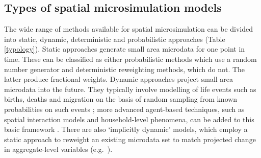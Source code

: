 \subsection{Types of spatial microsimulation models} %
\label{types-msim}
The wide range of methods available for spatial microsimulation can be divided
into static, dynamic, deterministic and probabilistic approaches (Table
\ref{typology}). Static approaches generate small
area microdata for one point in time. These can be classified as
either probabilistic methods which use a random number generator and
deterministic reweighting methods, which do not. The latter produce
fractional weights. Dynamic approaches project small
area microdata into the future. They typically involve modelling of
life events such as births, deaths and migration on the basis of random
sampling from known probabilities on such events \citep{Ballas2005c,
Vidyattama2010}; more advanced agent-based techniques, such as spatial
interaction models and household-level phenomena, can be added to this basic
framework \citep{Wu2008, Wu2010}. There
are also `implicitly dynamic' models, which employ a static
approach to reweight an existing microdata set to match
projected change in aggregate-level variables
(e.g.~\citealp{Ballas2005-ireland}).

